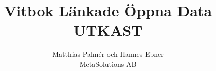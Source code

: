 \documentclass{report}
\title{Vitbok Länkade Öppna Data\\UTKAST}
\author{Matthias Palmér och Hannes Ebner\\MetaSolutions AB}
\begin{document}
\raggedbottom

\maketitle
\tableofcontents


\end{document}
